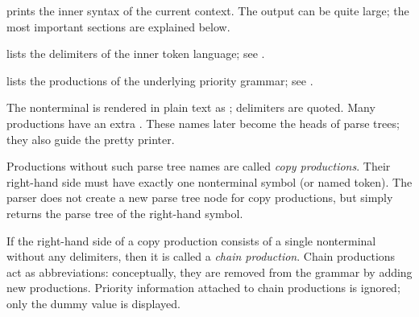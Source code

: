\begin{isabellebody}
\begin{isamarkuptext}
  \begin{description}

  \item \hyperlink{command.print-syntax}{\mbox{}} prints the inner syntax of the
  current context.  The output can be quite large; the most important
  sections are explained below.

  \begin{description}

  \item {} lists the delimiters of the inner token
  language; see .

  \item {} lists the productions of the underlying
  priority grammar; see .

  The nonterminal  is rendered in plain text as ; delimiters are quoted.  Many productions have an extra
  .  These names later become the heads of parse
  trees; they also guide the pretty printer.

  Productions without such parse tree names are called \emph{copy
  productions}.  Their right-hand side must have exactly one
  nonterminal symbol (or named token).  The parser does not create a
  new parse tree node for copy productions, but simply returns the
  parse tree of the right-hand symbol.

  If the right-hand side of a copy production consists of a single
  nonterminal without any delimiters, then it is called a \emph{chain
  production}.  Chain productions act as abbreviations: conceptually,
  they are removed from the grammar by adding new productions.
  Priority information attached to chain productions is ignored; only
  the dummy value  is displayed.


\end{description}
\end{description}
\end{isamarkuptext}
\end{isabellebody}
